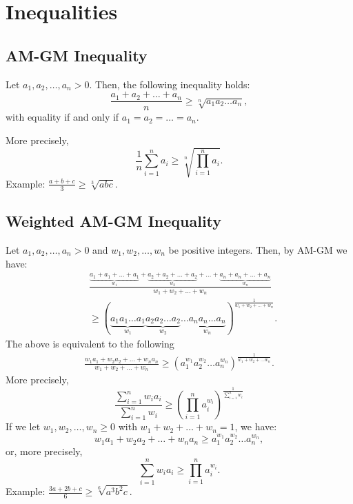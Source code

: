 \documentclass[a4paper,11pt]{article}
\begin{document}
\section{Inequalities}


\subsection{AM-GM Inequality}
\begin{tcolorbox}
    Let $a_1, a_2, \dots, a_n >0$. Then, the following inequality holds:
    \[
    \frac{a_1 + a_2 + \dots + a_n}{n} \geq \sqrt[n]{a_1 a_2 \dots a_n},
    \]
    with equality if and only if $a_1 = a_2 = \dots = a_n$.

    More precisely,
    \[
    \frac{1}{n} \sum_{i=1}^n a_i \geq \sqrt[n]{\prod_{i=1}^n a_i}.
    \]
    Example: $\textstyle \frac{a + b + c}{3} \geq \sqrt[3]{abc}$.
\end{tcolorbox}


\subsection{Weighted AM-GM Inequality}
\begin{tcolorbox}
    Let $a_1, a_2, \dots, a_n > 0$ and $w_1, w_2, \dots, w_n$ be positive integers. Then, by AM-GM we have:
    \begin{align*}
        &\frac{\underbrace{a_1 + a_1 + \dots + a_1}_{w_1} + \underbrace{a_2 + a_2 + \dots + a_2}_{w_2} + \dots + \underbrace{a_n + a_n + \dots + a_n}_{w_n}}{w_1 + w_2 + \dots + w_n} \\
        &\geq \left( \underbrace{a_1 a_1 \dots a_1}_{w_1} \underbrace{a_2 a_2 \dots a_2}_{w_2} \dots \underbrace{a_n a_n \dots a_n}_{w_n} \right)^{\frac{1}{w_1 + w_2 + \dots + w_n}}.
    \end{align*}
    The above is equivalent to the following
    \begin{align*}
        \frac{w_1 a_1 + w_2 a_2 + \dots + w_n a_n}{w_1 + w_2 + \dots + w_n} \geq (a_1^{w_1} a_2^{w_2} \dots a_n^{w_n})^\frac{1}{w_1 + w_2 + \dots w_n}.
    \end{align*}
    More precisely,
    \[
    \frac{\sum_{i=1}^n w_i a_i}{\sum_{i=1}^n w_i} \geq \left( \prod_{i=1}^n a_i^{w_i} \right)^{\frac{1}{\sum_{i=1}^n w_i}}
    \]
    If we let $w_1, w_2, \dots, w_n \geq 0$ with $w_1 + w_2 + \dots + w_n = 1$, we have:
    \[
    w_1a_1 + w_2a_2 + \dots + w_na_n \geq a_1^{w_1} a_2^{w_2} \dots a_n^{w_n},
    \]
    or, more precisely,
    \[
    \sum_{i=1}^n w_ia_i \geq \prod_{i=1}^n a_i^{w_i}.
    \]
    Example: $\textstyle \frac{3a + 2b + c}{6} \geq \sqrt[6]{a^3 b^2 c}$.
\end{tcolorbox}
\end{document}
